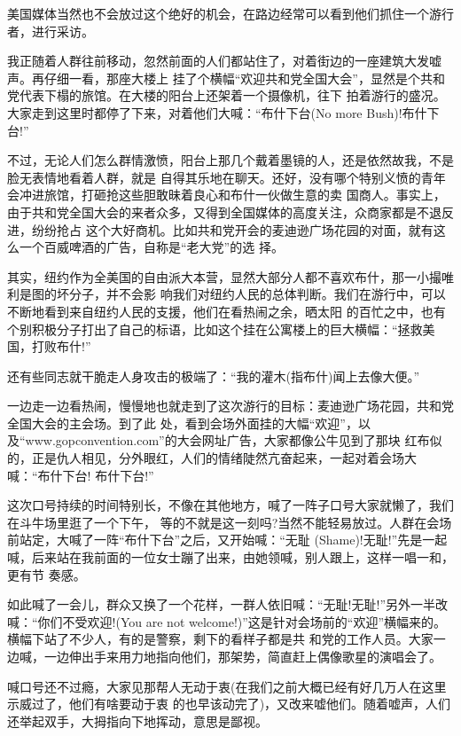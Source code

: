 ﻿\documentclass[11pt]{article}
\begin{document}
美国媒体当然也不会放过这个绝好的机会，在路边经常可以看到他们抓住一个游行者，进行采访。

我正随着人群往前移动，忽然前面的人们都站住了，对着街边的一座建筑大发嘘声。再仔细一看，那座大楼上
挂了个横幅``欢迎共和党全国大会''，显然是个共和党代表下榻的旅馆。在大楼的阳台上还架着一个摄像机，往下
拍着游行的盛况。大家走到这里时都停了下来，对着他们大喊：``布什下台(No more Bush)!布什下台!''

不过，无论人们怎么群情激愤，阳台上那几个戴着墨镜的人，还是依然故我，不是脸无表情地看着人群，就是
自得其乐地在聊天。还好，没有哪个特别义愤的青年会冲进旅馆，打砸抢这些胆敢昧着良心和布什一伙做生意的卖
国商人。事实上，由于共和党全国大会的来者众多，又得到全国媒体的高度关注，众商家都是不退反进，纷纷抢占
这个大好商机。比如共和党开会的麦迪逊广场花园的对面，就有这么一个百威啤酒的广告，自称是``老大党''的选
择。

其实，纽约作为全美国的自由派大本营，显然大部分人都不喜欢布什，那一小撮唯利是图的坏分子，并不会影
响我们对纽约人民的总体判断。我们在游行中，可以不断地看到来自纽约人民的支援，他们在看热闹之余，晒太阳
的百忙之中，也有个别积极分子打出了自己的标语，比如这个挂在公寓楼上的巨大横幅：``拯救美国，打败布什!''

还有些同志就干脆走人身攻击的极端了：``我的灌木(指布什)闻上去像大便。''

一边走一边看热闹，慢慢地也就走到了这次游行的目标：麦迪逊广场花园，共和党全国大会的主会场。到了此
处，看到会场外面挂的大幅``欢迎''，以及``www.gopconvention.com''的大会网址广告，大家都像公牛见到了那块
红布似的，正是仇人相见，分外眼红，人们的情绪陡然亢奋起来，一起对着会场大喊：``布什下台! 布什下台!''

这次口号持续的时间特别长，不像在其他地方，喊了一阵子口号大家就懒了，我们在斗牛场里逛了一个下午，
等的不就是这一刻吗?当然不能轻易放过。人群在会场前站定，大喊了一阵``布什下台''之后，又开始喊：``无耻
(Shame)!无耻!''先是一起喊，后来站在我前面的一位女士蹦了出来，由她领喊，别人跟上，这样一唱一和，更有节
奏感。

如此喊了一会儿，群众又换了一个花样，一群人依旧喊：``无耻!无耻!''另外一半改喊：``你们不受欢迎!(You
are not welcome!)''这是针对会场前的``欢迎''横幅来的。横幅下站了不少人，有的是警察，剩下的看样子都是共
和党的工作人员。大家一边喊，一边伸出手来用力地指向他们，那架势，简直赶上偶像歌星的演唱会了。

喊口号还不过瘾，大家见那帮人无动于衷(在我们之前大概已经有好几万人在这里示威过了，他们有啥要动于衷
的也早该动完了)，又改来嘘他们。随着嘘声，人们还举起双手，大拇指向下地挥动，意思是鄙视。
\end{document}
